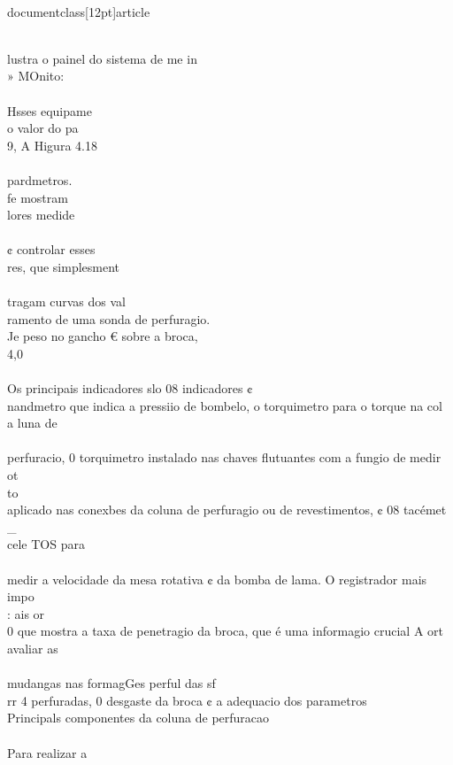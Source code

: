 \\documentclass[12pt]{article}
\begin{document}
\\{lustra o painel do sistema de me in\\
» MOnito:\\
\\
Hsses equipame\\
o valor do pa\\
9, A Higura 4.18\\
\\
pardmetros.\\
fe mostram\\
lores medide\\
\\
¢ controlar esses\\
res, que simplesment\\
\\
tragam curvas dos val\\
ramento de uma sonda de perfuragio.\\
Je peso no gancho € sobre a broca,\\
4,0\\
\\
Os principais indicadores slo 08 indicadores ¢\\
nandmetro que indica a pressiio de bombelo, o torquimetro para o torque na col\\
a luna de\\
\\
perfuracio, 0 torquimetro instalado nas chaves flutuantes com a fungio de medir ot\\
to\\
aplicado nas conexbes da coluna de perfuragio ou de revestimentos, ¢ 08 tacémet \\_\\
cele TOS para\\
\\
medir a velocidade da mesa rotativa ¢ da bomba de lama. O registrador mais impo\\
: ais or\\
0 que mostra a taxa de penetragio da broca, que é uma informagio crucial A ort\\
avaliar as\\
\\
mudangas nas formagGes perful das sf\\
rr 4 perfuradas, 0 desgaste da broca ¢ a adequacio dos parametros\\
Principals componentes da coluna de perfuracao\\
\\
Para realizar a\\
}
\end{document}
